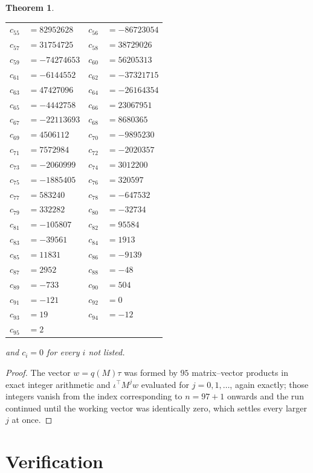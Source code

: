 \documentclass[11pt,a4paper]{article}
\theoremstyle{plain}
\newtheorem{theorem}{Theorem}
\theoremstyle{definition}
\begin{document}
\begin{theorem}
\begin{center}
\begin{tabular}{r@{\,}l@{\qquad}r@{\,}l}
$c_{55}$ & $=82952628$ & $c_{56}$ & $=-86723054$ \\
$c_{57}$ & $=31754725$ & $c_{58}$ & $=38729026$ \\
$c_{59}$ & $=-74274653$ & $c_{60}$ & $=56205313$ \\
$c_{61}$ & $=-6144552$ & $c_{62}$ & $=-37321715$ \\
$c_{63}$ & $=47427096$ & $c_{64}$ & $=-26164354$ \\
$c_{65}$ & $=-4442758$ & $c_{66}$ & $=23067951$ \\
$c_{67}$ & $=-22113693$ & $c_{68}$ & $=8680365$ \\
$c_{69}$ & $=4506112$ & $c_{70}$ & $=-9895230$ \\
$c_{71}$ & $=7572984$ & $c_{72}$ & $=-2020357$ \\
$c_{73}$ & $=-2060999$ & $c_{74}$ & $=3012200$ \\
$c_{75}$ & $=-1885405$ & $c_{76}$ & $=320597$ \\
$c_{77}$ & $=583240$ & $c_{78}$ & $=-647532$ \\
$c_{79}$ & $=332282$ & $c_{80}$ & $=-32734$ \\
$c_{81}$ & $=-105807$ & $c_{82}$ & $=95584$ \\
$c_{83}$ & $=-39561$ & $c_{84}$ & $=1913$ \\
$c_{85}$ & $=11831$ & $c_{86}$ & $=-9139$ \\
$c_{87}$ & $=2952$ & $c_{88}$ & $=-48$ \\
$c_{89}$ & $=-733$ & $c_{90}$ & $=504$ \\
$c_{91}$ & $=-121$ & $c_{92}$ & $=0$ \\
$c_{93}$ & $=19$ & $c_{94}$ & $=-12$ \\
$c_{95}$ & $=2$ \\
\end{tabular}
\end{center}
and $c_i=0$ for every $i$ not listed.
\end{theorem}

\begin{proof}
The vector $w=q(M)\tau$ was formed by $95$ matrix--vector products in exact integer
arithmetic and $\iota^{\!\top}M^{j}w$ evaluated for $j=0,1,\dots$, again exactly; those
integers vanish from the index corresponding to $n=97+1$ onwards and the run continued
until the working vector was identically zero, which settles every larger $j$ at once.
\end{proof}

\section{Verification}
\end{document}
